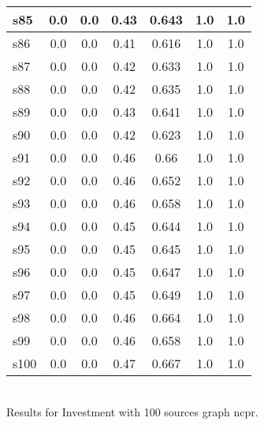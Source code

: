 \documentclass{article}
\begin{document}
\begin{tabular}{|l|c|c|c|c|c|c|}
\hline
s85 &0.0 & 0.0 & 0.43 & 0.643 & 1.0 & 1.0\\
\hline
s86 &0.0 & 0.0 & 0.41 & 0.616 & 1.0 & 1.0\\
\hline
s87 &0.0 & 0.0 & 0.42 & 0.633 & 1.0 & 1.0\\
\hline
s88 &0.0 & 0.0 & 0.42 & 0.635 & 1.0 & 1.0\\
\hline
s89 &0.0 & 0.0 & 0.43 & 0.641 & 1.0 & 1.0\\
\hline
s90 &0.0 & 0.0 & 0.42 & 0.623 & 1.0 & 1.0\\
\hline
s91 &0.0 & 0.0 & 0.46 & 0.66 & 1.0 & 1.0\\
\hline
s92 &0.0 & 0.0 & 0.46 & 0.652 & 1.0 & 1.0\\
\hline
s93 &0.0 & 0.0 & 0.46 & 0.658 & 1.0 & 1.0\\
\hline
s94 &0.0 & 0.0 & 0.45 & 0.644 & 1.0 & 1.0\\
\hline
s95 &0.0 & 0.0 & 0.45 & 0.645 & 1.0 & 1.0\\
\hline
s96 &0.0 & 0.0 & 0.45 & 0.647 & 1.0 & 1.0\\
\hline
s97 &0.0 & 0.0 & 0.45 & 0.649 & 1.0 & 1.0\\
\hline
s98 &0.0 & 0.0 & 0.46 & 0.664 & 1.0 & 1.0\\
\hline
s99 &0.0 & 0.0 & 0.46 & 0.658 & 1.0 & 1.0\\
\hline
s100 &0.0 & 0.0 & 0.47 & 0.667 & 1.0 & 1.0\\
\hline
\end{tabular}\\

\noindent Results for Investment with 100 sources graph ncpr.
\end{document}
